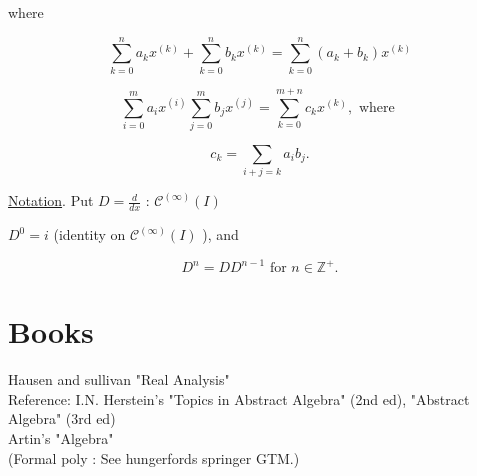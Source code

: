 \documentclass{book}
\theoremstyle{definition}
\begin{document}
 where

 \[ \sum_{k=0}^n a_kx^{(k)} + \sum_{k=0}^n b_kx^{(k)} = \sum_{k=0}^n
 (a_k + b_k)x^{(k)}   \]

 \[ \sum_{i=0}^m a_ix^{(i)} \sum_{j=0}^m b_jx^{(j)}  = \sum_{k=0}^{m+n}
 c_k x^{(k)}, \text{ where }\]

 \[ c_k = \sum_{i+j=k} a_ib_j .\]

 \underline{Notation}. Put \( D = \frac{d}{dx} \text{ : }
 \mathscr{C}^{(\infty)} (I)  \) 

 \( D^0 = i \) (identity on \(\mathscr{C}^{(\infty)} (I) \) ), and 

 \[ D^n = D D^{n-1} \text{ for } n \in \mathbb{Z}^+ .\]

 




\newpage
\section*{Books}
 Hausen and sullivan "Real Analysis" \\
 Reference: I.N. Herstein's "Topics in Abstract Algebra" (2nd ed),
 "Abstract Algebra" (3rd ed)\\
 Artin's "Algebra" \\
 (Formal poly : See hungerfords springer GTM.) \\









\end{document}
